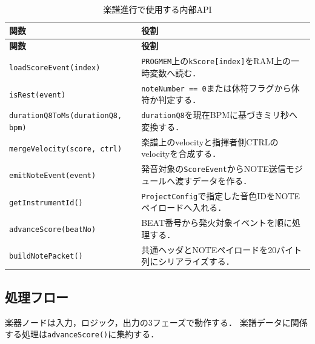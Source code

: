 \documentclass[uplatex,dvipdfmx]{jlreq}
\newcommand{\code}[1]{\texttt{#1}}
\begin{document}
\begin{longtable}{p{}p{}}
\caption{楽譜進行で使用する内部API}\label{tab:saito-api}\\
\toprule
\textbf{関数} & \textbf{役割} \\
\midrule
\endfirsthead
\toprule
\textbf{関数} & \textbf{役割} \\
\midrule
\endhead
\code{loadScoreEvent(index)} &
\code{PROGMEM}上の\code{kScore[index]}をRAM上の一時変数へ読む．\\
\code{isRest(event)} &
\code{noteNumber == 0}または休符フラグから休符か判定する．\\
\code{durationQ8ToMs(durationQ8, bpm)} &
\code{durationQ8}を現在BPMに基づきミリ秒へ変換する．\\
\code{mergeVelocity(score, ctrl)} &
楽譜上のvelocityと指揮者側CTRLのvelocityを合成する．\\
\code{emitNoteEvent(event)} &
発音対象の\code{ScoreEvent}からNOTE送信モジュールへ渡すデータを作る．\\
\code{getInstrumentId()} &
\code{ProjectConfig}で指定した音色IDをNOTEペイロードへ入れる．\\
\code{advanceScore(beatNo)} &
BEAT番号から発火対象イベントを順に処理する．\\
\code{buildNotePacket()} &
共通ヘッダとNOTEペイロードを20バイト列にシリアライズする．\\
\bottomrule
\end{longtable}

\subsection{処理フロー}

楽器ノードは入力，ロジック，出力の3フェーズで動作する．
楽譜データに関係する処理は\code{advanceScore()}に集約する．
\end{document}
